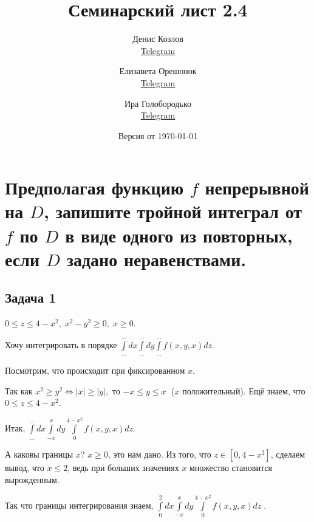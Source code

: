 \documentclass[a4paper, fleqn]{article}
\title{Семинарский лист 2.4}
\author{
    Денис Козлов         \\ \href{https://t.me/DKozl50}{Telegram} \and
    Елизавета Орешонок   \\ \href{https://t.me/eaoresh}{Telegram} \and
    Ира Голобородько     \\ \href{https://t.me/Ira4kgl}{Telegram}
}
\date{Версия от {\ddmmyyyydate\today} \currenttime}
\begin{document}
    \maketitle
   
    \section*{Предполагая функцию $f$ непрерывной на $D$, запишите тройной интеграл от $f$ по $D$ в виде
    одного из повторных, если $D$ задано неравенствами.}
    
    \subsection*{Задача 1} 
    
    $0 \leq z \leq 4 - x^2, \; x^2 - y^2 \geq 0, \; x \geq 0. $
    
    Хочу интегрировать в порядке $\displaystyle \int \limits_{\dots}^{\dots} dx \int \limits_{\dots}^{\dots} dy \int \limits_{\dots}^{\dots} f(x, y, x) dz.$
    
    Посмотрим, что происходит при фиксированном $x$.
    
    Так как $x^2 \geq y^2 \iff |x| \geq |y|,$ то $-x \leq y \leq x \;  $ ($x$ положительный). Ещё знаем, что $0 \leq z \leq 4 -x^2.$
    
    Итак,  $\displaystyle \int \limits_{\dots}^{\dots} dx \int \limits_{-x}^{x} dy \int \limits_{0}^{4 -x^2} f(x, y, x) dz.$ 
    
    А каковы границы $x$? $x \geq 0$, это нам дано. Из того, что $z \in [0, 4 -x^2]$, сделаем вывод, что $x \leq 2$, ведь при больших значениях $x$ множество становится вырожденным.
    
    Так что границы интегрирования знаем,  $\boxed{\displaystyle \int \limits_{0}^{2} dx \int \limits_{-x}^{x} dy \int \limits_{0}^{4 -x^2} f(x, y, x) dz} \; .$ 
    
    
\end{document}

